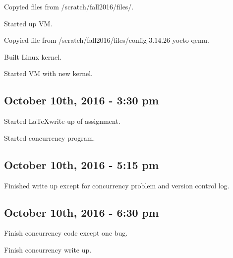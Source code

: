 \documentclass[letterpaper,10pt]{article}
\begin{document}
Copyied files from /scratch/fall2016/files/.

Started up VM.

Copyied file from /scratch/fall2016/files/config-3.14.26-yocto-qemu.

Built Linux kernel.

Started VM with new kernel.
\subsection{October 10th, 2016 - 3:30 pm}
Started \LaTeX write-up of assignment.

Started concurrency program.
\subsection{October 10th, 2016 - 5:15 pm}
Finished write up except for concurrency problem and version control log.
\subsection{October 10th, 2016 - 6:30 pm}
Finish concurrency code except one bug.

Finish concurrency write up.
\end{document}
